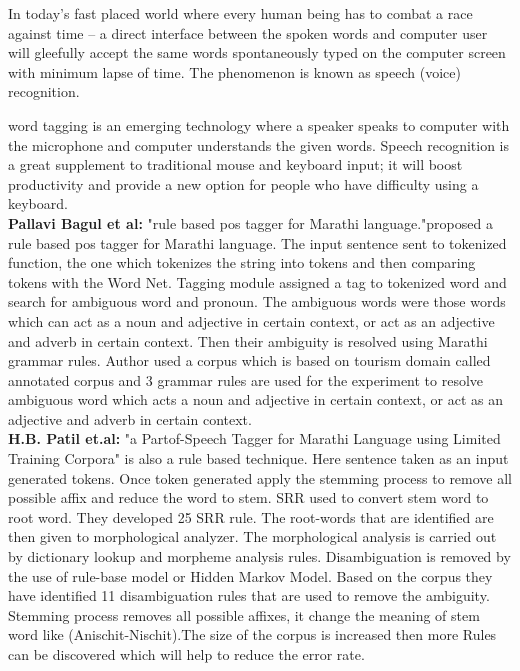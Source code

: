 \documentclass[12pt,a4paper,oneside]{memoir}
\begin{document}
In today’s fast placed world where every human being has to combat a race against
time – a direct interface between the spoken words and computer user will gleefully
accept the same words spontaneously typed on the computer screen with minimum
lapse of time. The phenomenon is known as speech (voice) recognition.

word tagging is an emerging technology where a speaker speaks to computer
with the microphone and computer understands the given words. Speech recognition
is a great supplement to traditional mouse and keyboard input; it will boost
productivity and provide a new option for people who have difficulty using a
keyboard.\\


\textbf{Pallavi Bagul et al:} "rule based pos tagger for Marathi language."proposed a rule based pos tagger for Marathi language. The input sentence sent to tokenized function, the one which tokenizes the string into tokens and then comparing tokens with the Word Net. Tagging module assigned a tag to tokenized word and search for ambiguous word and pronoun. The ambiguous words were those words which can act as a noun and adjective in certain context, or act as an adjective and adverb in certain context. Then their ambiguity is resolved using Marathi grammar rules. Author used a corpus which is based on tourism domain called annotated corpus and 3 grammar rules are used for the experiment to resolve ambiguous word which acts a noun and adjective in certain context, or act as an adjective and adverb in certain context. 
\\

\textbf{H.B. Patil et.al:} "a Partof-Speech Tagger for Marathi Language using Limited Training Corpora" is also a rule based technique. Here sentence taken as an input generated tokens. Once token generated apply the stemming process to remove all possible affix and reduce the word to stem. SRR used to convert stem word to root word. They developed 25 SRR rule. The root-words that are identified are then given to morphological analyzer. The morphological analysis is carried out by dictionary lookup and morpheme analysis rules. Disambiguation is removed by the use of rule-base model or Hidden Markov Model. Based on the corpus they have identified 11 disambiguation rules that are used to remove the ambiguity. Stemming process removes all possible affixes, it change the meaning of stem word like (Anischit-Nischit).The size of the corpus is increased then more Rules can be discovered which will help to reduce the error rate.\\
\end{document}

